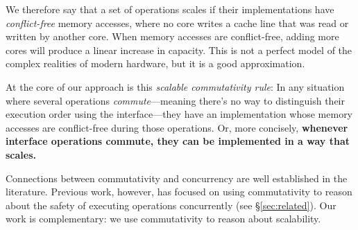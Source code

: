 We therefore say that a set of operations scales if their implementations
have \emph{conflict-free} memory accesses, where no core writes a
cache line that was read or written by another core.
%
When memory accesses are conflict-free, adding more cores will produce
a linear increase in capacity.
This is not a perfect model of the complex realities of
modern hardware, but it is a good approximation. 

At the core of our approach is this \emph{scalable commutativity rule}: In any
situation where several operations \emph{commute}---meaning
there's no way to distinguish their execution order using the
interface---they have an implementation whose memory accesses
are conflict-free during those operations.
Or, more concisely,
\textbf{whenever interface operations commute, they can be implemented in a way
  that scales.}
%
%

\cbstart
Connections between commutativity and concurrency are well
established in the literature.  Previous work, however, has focused on
using commutativity to reason about the safety of executing operations
concurrently (see \S\ref{sec:related}).  Our work is complementary: we
use commutativity to reason about scalability.
\cbend


